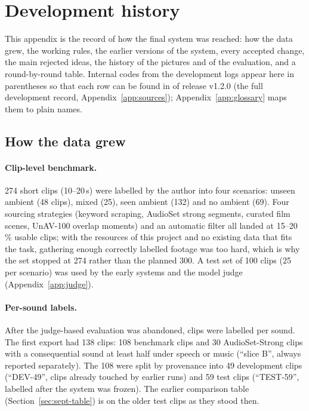 \section{Development history}\label{app:history}

This appendix is the record of how the final system was reached: how the data grew, the working rules, the earlier
versions of the system, every accepted change, the main rejected ideas, the history of the pictures and of the
evaluation, and a round-by-round table. Internal codes from the development logs appear here in parentheses so
that each row can be found in  of release v1.2.0 (the full development record,
Appendix~\ref{app:sources}); Appendix~\ref{app:glossary} maps them to plain names.

\subsection{How the data grew}\label{app:datahistory}
\paragraph{Clip-level benchmark.} 274 short clips (10--20\,s) were labelled by the author into four
scenarios: unseen ambient (48 clips), mixed (25), seen ambient (132) and no ambient (69). Four sourcing strategies
(keyword scraping, AudioSet strong segments, curated film scenes, UnAV-100 overlap moments) and an automatic filter
all landed at 15--20\,\% usable clips; with the resources of this project and no existing data that fits the task,
gathering enough correctly labelled footage was too hard, which is why the set stopped at 274 rather than the planned 300. A test set of
100 clips (25 per scenario) was used by the early systems and the model judge (Appendix~\ref{app:judge}).

\paragraph{Per-sound labels.} After the judge-based evaluation was abandoned, clips were labelled per
sound. The first export had 138 clips: 108 benchmark clips and 30 AudioSet-Strong clips with a consequential sound at
least half under speech or music (``slice B'', always reported separately). The 108 were split by provenance into 49
development clips (``DEV-49'', clips already touched by earlier runs) and 59 test clips (``TEST-59'', labelled after
the system was frozen). The earlier comparison table (Section~\ref{sec:sept-table}) is on the older test clips as they stood then.

